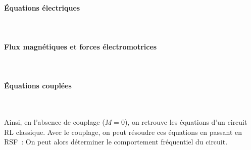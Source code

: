 \documentclass[../../main/main.tex]{subfiles}
\begin{document}
\vspace{-15pt}
\paragraph*{Équations électriques}~
\smallbreak
\begin{isd}
	\psw{%
		\[
			u + e_1 = R_1i_1
		\]
	}%
	\vspace{-15pt}
	\tcblower
	\psw{%
		\[
			e_2 = R_2i_2
		\]
	}
	\vspace{-15pt}
\end{isd}

\newpage
\paragraph*{Flux magnétiques et forces électromotrices}~
\smallbreak
\begin{isd}
	\tcblower
\end{isd}

\vspace{-15pt}
\paragraph*{Équations couplées}~
\smallbreak
\begin{isd}
	\psw{%
		\[
			R_1i_1 + L_1 \dv{i_1}{t} + M \dv{i_2}{t} = u
		\]
	}%
	\vspace{-15pt}
	\tcblower
	\psw{%
		\[
			R_2i_2 + L_2 \dv{i_2}{t} + M \dv{i_1}{t} = 0
		\]
	}%
	\vspace{-15pt}
\end{isd}

Ainsi, en l'absence de couplage ($M = 0$), on retrouve les équations d'un
circuit RL classique. Avec le couplage, on peut résoudre ces équations en
passant en RSF~:
\psw{%
	\[
		(R_1 + \jj L_1 \w)\xul{I_1} + \jj M \w \xul{I_2} = \xul{U}
		\qqet
		(R_2 + \jj L_2\w)\xul{I_2} + \jj M\w \xul{I_1} = 0
	\]
}%
On peut alors déterminer le comportement fréquentiel du circuit.
\end{document}
